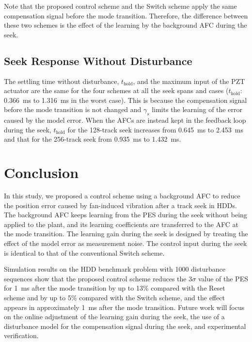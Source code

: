 \documentclass[conference]{IEEEtran}
\begin{document}
Note that the proposed control scheme and the Switch scheme apply the same
compensation signal before the mode transition. Therefore, the difference
between these two schemes is the effect of the learning by the background AFC
during the seek.

\subsection{Seek Response Without Disturbance}
The settling time without disturbance, $t_\mathrm{hold}$, and the maximum input
of the PZT actuator are the same for the four schemes at all the seek spans and
cases ($t_\mathrm{hold}$: 0.366~ms to 1.316~ms in the worst case). This is
because the compensation signal before the mode transition is not changed and
$\gamma_s$ limits the learning of the error caused by the model error. When the
AFCs are instead kept in the feedback loop during the seek, $t_\mathrm{hold}$
for the 128-track seek increases from 0.645~ms to 2.453~ms and that for the
256-track seek from 0.935~ms to 1.432~ms.

\section{Conclusion}

In this study, we proposed a control scheme using a background AFC to reduce
the position error caused by fan-induced vibration after a track seek in HDDs.
The background AFC keeps learning from the PES during the seek without being
applied to the plant, and its learning coefficients are transferred to the AFC
at the mode transition. The learning gain during the seek is designed by
treating the effect of the model error as measurement noise. The control input
during the seek is identical to that of the conventional Switch scheme.

Simulation results on the HDD benchmark problem with 1000 disturbance
sequences show that the proposed control scheme reduces the $3\sigma$ value of
the PES for 1~ms after the mode transition by up to 13\% compared with the
Reset scheme and by up to 5\% compared with the Switch scheme, and the effect
appears in approximately 1~ms after the mode transition. Future work will focus on the online adjustment of the learning
gain during the seek, the use of a disturbance model for the compensation
signal during the seek, and experimental verification.



\end{document}
